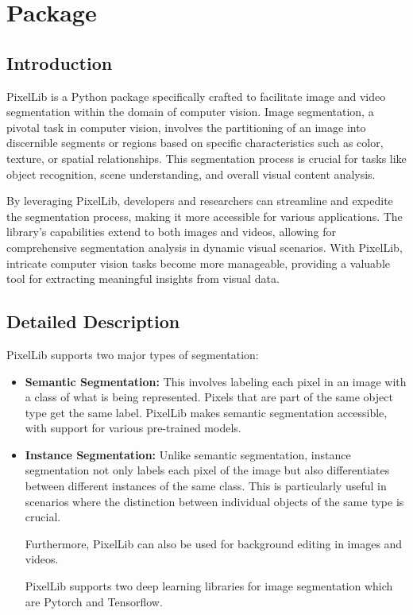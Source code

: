 %
%



\chapter{Package }

\section{Introduction}

PixelLib is a Python package specifically crafted to facilitate image and video segmentation within the domain of computer vision. Image segmentation, a pivotal task in computer vision, involves the partitioning of an image into discernible segments or regions based on specific characteristics such as color, texture, or spatial relationships. This segmentation process is crucial for tasks like object recognition, scene understanding, and overall visual content analysis.

By leveraging PixelLib, developers and researchers can streamline and expedite the segmentation process, making it more accessible for various applications. The library's capabilities extend to both images and videos, allowing for comprehensive segmentation analysis in dynamic visual scenarios. With PixelLib, intricate computer vision tasks become more manageable, providing a valuable tool for extracting meaningful insights from visual data.

\section{Detailed Description}
PixelLib supports two major types of segmentation:

\begin{itemize}
    \item \textbf{Semantic Segmentation:} This involves labeling each pixel in an image with a class of what is being represented. Pixels that are part of the same object type get the same label. PixelLib makes semantic segmentation accessible, with support for various pre-trained models.
    
    \item \textbf{Instance Segmentation:} Unlike semantic segmentation, instance segmentation not only labels each pixel of the image but also differentiates between different instances of the same class. This is particularly useful in scenarios where the distinction between individual objects of the same type is crucial.\newline
    
    Furthermore, PixelLib can also be used for background editing in images and videos.
    
    PixelLib supports two deep learning libraries for image segmentation which are Pytorch and Tensorflow.
\end{itemize}

